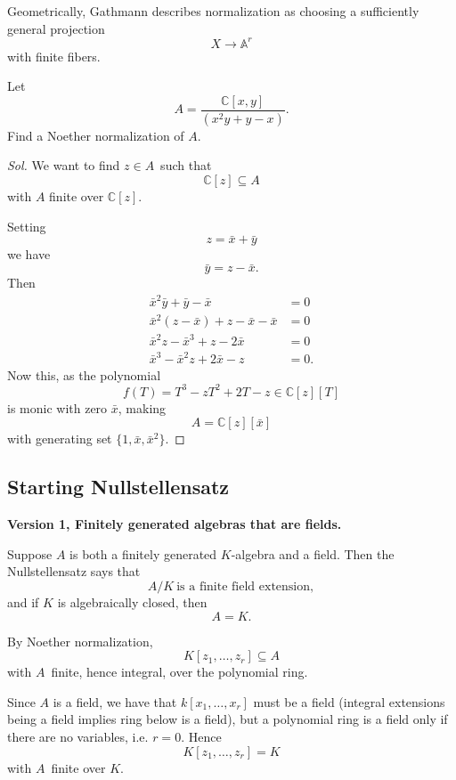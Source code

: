 \documentclass[11pt]{article}
\begin{document}
Geometrically, Gathmann describes normalization as choosing a 
sufficiently general projection 
\[
    X \longrightarrow \mathbb A^r 
\]
with finite fibers. 

\begin{prob}
    Let 
    \[
        A = \frac{\mathbb C[x,y]}{(x^2y + y - x)}. 
    \]
    Find a Noether normalization of $A$. 
\end{prob}
\begin{proof}[Sol]
    We want to find $z \in A$ such that 
    \[
        \mathbb C[z] \subseteq A 
    \]
    with $A$ finite over $\mathbb C[z]$. 

    Setting 
    \[
        z = \bar x + \bar y 
    \]
    we have 
    \[
        \bar y = z - \bar x. 
    \]
    Then 
    \begin{align*}
        \bar x^2\bar y + \bar y - \bar x &= 0 \\ 
        \bar x^2(z - \bar x) + z - \bar x - \bar x &= 0 \\ 
        \bar x^2z - \bar x^3 + z - 2\bar x &= 0 \\ 
        \bar x^3 - \bar x^2z + 2\bar x - z &= 0. 
    \end{align*}
    Now this, as the polynomial 
    \[
        f(T) = T^3 - zT^2 + 2T - z \in \mathbb C[z][T]
    \] 
    is monic with zero $\bar x$, making 
    \[
        A = \mathbb C[z][\bar x] 
    \]
    with generating set $\{1,\bar x, \bar x^2\}$.
\end{proof}


\subsection{Starting Nullstellensatz}

\textbf{Version 1, Finitely generated algebras that are fields.}

Suppose $A$ is both a finitely generated $K$-algebra and 
a field. 
Then the Nullstellensatz says that 
\[
    A/K \ \text{is a finite field extension}, 
\]
and if $K$ is algebraically closed, then 
\[
    A = K.
\]

By Noether normalization, 
\[
    K[z_1,\ldots,z_r] \subseteq A 
\]
with $A$ finite, hence integral, over the polynomial ring. 

Since $A$ is a field, we have that 
$k[x_1,\ldots,x_r]$ must be a field (integral extensions being 
a field implies ring below is a field), 
but a polynomial ring is a field only if there are no variables, 
i.e. $r = 0$. 
Hence 
\[
    K[z_1,\ldots,z_r] = K
\]
with $A$ finite over $K$. 
\end{document}
